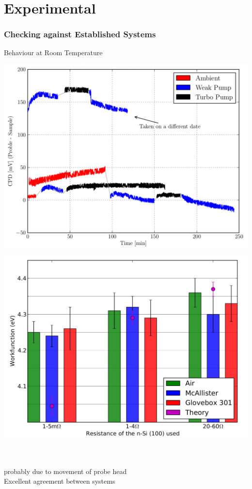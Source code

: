 \documentclass{beamer}
\begin{document}
\section{Experimental}
\begin{frame}
\frametitle{Checking against Established Systems}
\begin{block}{Behaviour at Room Temperature}
\centering
\begin{minipage}{0.45\linewidth}
\centering
	\includegraphics[width=1\linewidth]{./figs/pres/HOPGMcA}
\end{minipage}
\hfill
\begin{minipage}{0.45\linewidth}
\centering
	\includegraphics[width=1\linewidth]{./figs/pres/Sih}
\end{minipage}\\[5pt]\hrulefill\\
 probably due to movement of probe head\\
Excellent agreement between systems
\end{block}\end{frame}
\end{document}
